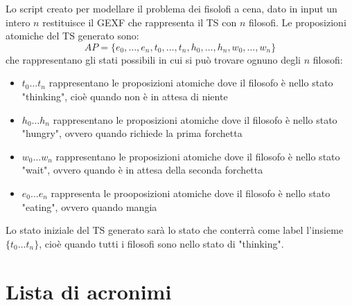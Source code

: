 \documentclass[a4paper, 10pt]{article}
\numberwithin{equation}{theor}
\begin{document}
Lo script creato per modellare il problema dei fisolofi a cena, dato in input un intero $n$ restituisce il \ac{GEXF} che rappresenta il \ac{TS} con $n$ filosofi.
Le proposizioni atomiche del \ac{TS} generato sono:
$$AP = \{e_0, \dots, e_n, t_0, \dots, t_n, h_0, \dots, h_n, w_0, \dots, w_n \}$$
che rappresentano gli stati possibili in cui si può trovare ognuno degli $n$ filosofi:
\begin{itemize}
  \item{$t_0 \dots t_n$ rappresentano le proposizioni atomiche dove il filosofo è nello stato "thinking", cioè quando non è in attesa di niente}
  \item{$h_0 \dots h_n$ rappresentano le proposizioni atomiche dove il filosofo è nello stato "hungry", ovvero quando richiede la prima forchetta}
  \item{$w_0 \dots w_n$ rappresentano le proposizioni atomiche dove il filosofo è nello stato "wait", ovvero quando è in attesa della seconda forchetta}
  \item{$e_0 \dots e_n$ rappresenta le prooposizioni atomiche dove il filosofo è nello stato "eating", ovvero quando mangia}
\end{itemize}
Lo stato iniziale del \ac{TS} generato sarà lo stato che conterrà come label l'insieme $\{t_0 \dots t_n\}$, cioè quando tutti i filosofi sono nello stato di "thinking".







\section*{Lista di acronimi}
\begin{acronym}
\end{acronym}
\end{document}
